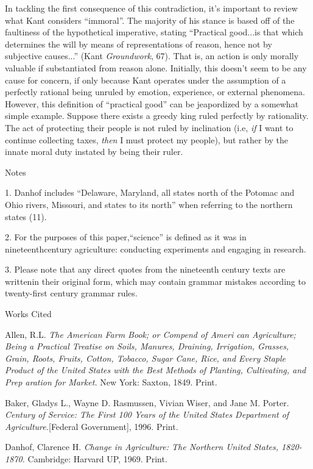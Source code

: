 \documentclass[12pt]{article}
\newcommand{\bibent}{\noindent \hangindent 40pt}
\newenvironment{workscited}{\newpage \begin{center} Works Cited \end{center}}{\newpage }
\begin{document}
\begin{flushleft}
In tackling the first consequence of this contradiction, it's important to review what Kant considers ``immoral''. The majority of his stance is based off of the faultiness of the hypothetical imperative, stating ``Practical good...is that which determines the will by means of representations of reason, hence not by subjective causes...'' (Kant \textit{Groundwork}, 67). That is, an action is only morally valuable if substantiated from reason alone. Initially, this doesn't seem to be any cause for concern, if only because Kant operates under the assumption of a perfectly rational being unruled by emotion, experience, or external phenomena. However, this definition of ``practical good'' can be jeapordized by a somewhat simple example. Suppose there exists a greedy king ruled perfectly by rationality. The act of protecting their people is not ruled by inclination (i.e, \textit{if} I want to continue collecting taxes, \textit{then} I must protect my people), but rather by the innate moral duty instated by being their ruler.
\newpage


\begin{center}
Notes
\end{center}


\setlength{\parindent}{0.5in}

1. Danhof includes “Delaware, Maryland, all states north of the Potomac and Ohio rivers, Missouri, and states to its north” when referring to the northern states (11).


2. For the purposes of this paper,“science” is defined as it was in nineteenthcentury agriculture: conducting experiments and engaging in research.


3. Please note that any direct quotes from the nineteenth century texts are writtenin their original form, which may contain grammar mistakes according to twenty-first century grammar rules.

\begin{workscited}

\bibent
Allen, R.L. \textit{The American Farm Book; or Compend of Ameri can Agriculture; Being a Practical Treatise on Soils, Manures, Draining, Irrigation, Grasses, Grain, Roots, Fruits, Cotton, Tobacco, Sugar Cane, Rice, and Every Staple Product of the United States with the Best Methods of Planting, Cultivating, and Prep aration for Market.} New York: Saxton, 1849. Print.

\bibent
Baker, Gladys L., Wayne D. Rasmussen, Vivian Wiser, and Jane M. Porter. \textit{Century of Service: The First 100 Years of the United States Department of Agriculture.}[Federal Government], 1996. Print.

\bibent
Danhof, Clarence H. \textit{Change in Agriculture: The Northern United States, 1820-1870.} Cambridge: Harvard UP, 1969. Print.


\end{workscited}

\end{flushleft}
\end{document}
